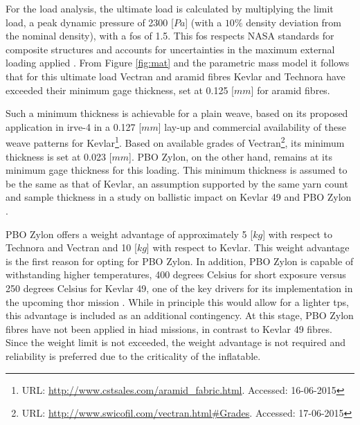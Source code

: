 For the load analysis, the ultimate load is calculated by multiplying the limit load, a peak dynamic pressure of 2300 [$Pa$] (with a $10\%$ density deviation from the nominal density), with a \acrfull{fos} of 1.5. This \gls{fos} respects NASA standards for composite structures and accounts for uncertainties in the maximum external loading applied \cite{Technical2014}.  
From Figure \ref{fig:mat} and the parametric mass model it follows that for this ultimate load Vectran and aramid fibres Kevlar and Technora have exceeded their minimum gage thickness, set at 0.125 [$mm$] for aramid fibres. 

Such a minimum thickness is achievable for a plain weave, based on its proposed application in \gls{irve}-4 in a 0.127 [$mm$] lay-up \cite{Litton2011} and commercial availability of these weave patterns for Kevlar\footnote{URL: \url{http://www.cstsales.com/aramid_fabric.html}. Accessed: 16-06-2015}. Based on available grades of Vectran\footnote{URL: \url{http://www.swicofil.com/vectran.html\#Grades}. Accessed: 17-06-2015}, its minimum thickness is set at 0.023 [$mm$]. PBO Zylon, on the other hand, remains at its minimum gage thickness for this loading. This minimum thickness is assumed to be the same as that of Kevlar, an assumption supported by the same yarn count and sample thickness in a study on ballistic impact on Kevlar 49 and PBO Zylon \cite{Pereira2009}. 

PBO Zylon offers a weight advantage of approximately 5 [$kg$] with respect to Technora and Vectran and 10 [$kg$] with respect to Kevlar. This weight advantage is the first reason for opting for PBO Zylon. In addition, PBO Zylon is capable of withstanding higher temperatures, 400 degrees Celsius for short exposure versus 250 degrees Celsius for Kevlar 49, one of the key drivers for its implementation in the upcoming \gls{thor} mission \cite{Dillman2014}. While in principle this would allow for a lighter \gls{tps}, this advantage is included as an additional contingency. At this stage, PBO Zylon fibres have not been applied in \gls{hiad} missions, in contrast to Kevlar 49 fibres. Since the weight limit is not exceeded, the weight advantage is not required and reliability is preferred due to the criticality of the inflatable. 


